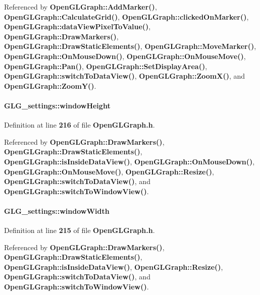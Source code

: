 Referenced by {\bf Open\+G\+L\+Graph\+::\+Add\+Marker()}, {\bf Open\+G\+L\+Graph\+::\+Calculate\+Grid()}, {\bf Open\+G\+L\+Graph\+::clicked\+On\+Marker()}, {\bf Open\+G\+L\+Graph\+::data\+View\+Pixel\+To\+Value()}, {\bf Open\+G\+L\+Graph\+::\+Draw\+Markers()}, {\bf Open\+G\+L\+Graph\+::\+Draw\+Static\+Elements()}, {\bf Open\+G\+L\+Graph\+::\+Move\+Marker()}, {\bf Open\+G\+L\+Graph\+::\+On\+Mouse\+Down()}, {\bf Open\+G\+L\+Graph\+::\+On\+Mouse\+Move()}, {\bf Open\+G\+L\+Graph\+::\+Pan()}, {\bf Open\+G\+L\+Graph\+::\+Set\+Display\+Area()}, {\bf Open\+G\+L\+Graph\+::switch\+To\+Data\+View()}, {\bf Open\+G\+L\+Graph\+::\+Zoom\+X()}, and {\bf Open\+G\+L\+Graph\+::\+Zoom\+Y()}.

\paragraph[{window\+Height}]{ G\+L\+G\+\_\+settings\+::window\+Height}\label{structGLG__settings_af36695c4e320ee40ddfa73a701a01e52}


Definition at line {\bf 216} of file {\bf Open\+G\+L\+Graph.\+h}.



Referenced by {\bf Open\+G\+L\+Graph\+::\+Draw\+Markers()}, {\bf Open\+G\+L\+Graph\+::\+Draw\+Static\+Elements()}, {\bf Open\+G\+L\+Graph\+::is\+Inside\+Data\+View()}, {\bf Open\+G\+L\+Graph\+::\+On\+Mouse\+Down()}, {\bf Open\+G\+L\+Graph\+::\+On\+Mouse\+Move()}, {\bf Open\+G\+L\+Graph\+::\+Resize()}, {\bf Open\+G\+L\+Graph\+::switch\+To\+Data\+View()}, and {\bf Open\+G\+L\+Graph\+::switch\+To\+Window\+View()}.

\paragraph[{window\+Width}]{ G\+L\+G\+\_\+settings\+::window\+Width}\label{structGLG__settings_aaa623853a072110c5f973ae6faff844b}


Definition at line {\bf 215} of file {\bf Open\+G\+L\+Graph.\+h}.



Referenced by {\bf Open\+G\+L\+Graph\+::\+Draw\+Markers()}, {\bf Open\+G\+L\+Graph\+::\+Draw\+Static\+Elements()}, {\bf Open\+G\+L\+Graph\+::is\+Inside\+Data\+View()}, {\bf Open\+G\+L\+Graph\+::\+Resize()}, {\bf Open\+G\+L\+Graph\+::switch\+To\+Data\+View()}, and {\bf Open\+G\+L\+Graph\+::switch\+To\+Window\+View()}.

